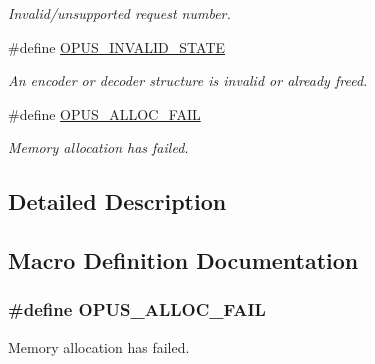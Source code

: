 \begin{DoxyCompactItemize}
\begin{DoxyCompactList}\small\item\em Invalid/unsupported request number. \end{DoxyCompactList}\item 
\#define \hyperlink{group__opus__errorcodes_ga54416ec79619179d688918f25e9b20e3}{O\+P\+U\+S\+\_\+\+I\+N\+V\+A\+L\+I\+D\+\_\+\+S\+T\+A\+TE}
\begin{DoxyCompactList}\small\item\em An encoder or decoder structure is invalid or already freed. \end{DoxyCompactList}\item 
\#define \hyperlink{group__opus__errorcodes_ga92fae6b1de2ac16b8d96561f9a8fb8b9}{O\+P\+U\+S\+\_\+\+A\+L\+L\+O\+C\+\_\+\+F\+A\+IL}
\begin{DoxyCompactList}\small\item\em Memory allocation has failed. \end{DoxyCompactList}\end{DoxyCompactItemize}


\subsection{Detailed Description}


\subsection{Macro Definition Documentation}
\subsubsection[{\texorpdfstring{O\+P\+U\+S\+\_\+\+A\+L\+L\+O\+C\+\_\+\+F\+A\+IL}{OPUS_ALLOC_FAIL}}]{\setlength{\rightskip}{0pt plus 5cm}\#define O\+P\+U\+S\+\_\+\+A\+L\+L\+O\+C\+\_\+\+F\+A\+IL}\hypertarget{group__opus__errorcodes_ga92fae6b1de2ac16b8d96561f9a8fb8b9}{}\label{group__opus__errorcodes_ga92fae6b1de2ac16b8d96561f9a8fb8b9}


Memory allocation has failed. 


